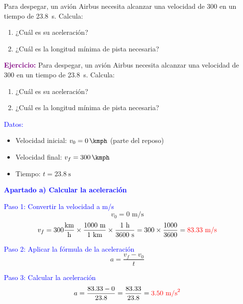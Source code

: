\begin{exercise}
    Para despegar, un avión Airbus necesita alcanzar una velocidad de \qty{300}{\kmph} en un tiempo de \qty{23.8}{\s}. Calcula:
    \begin{enumerate}[label=\letraminuscula]
    \item ¿Cuál es su aceleración?
    \item ¿Cuál es la longitud mínima de pista necesaria?
    \end{enumerate}
    \begin{solu}
        \textbf{\textcolor{purple}{Ejercicio:}} Para despegar, un avión Airbus necesita alcanzar una velocidad de \qty{300}{\kmph} en un tiempo de \qty{23.8}{\s}. Calcula:
        \begin{enumerate}[label=\letraminuscula]
            \item ¿Cuál es su aceleración?
            \item ¿Cuál es la longitud mínima de pista necesaria?
        \end{enumerate}

        \vspace{0.3cm}

        \textcolor{blue}{Datos:}
        \begin{itemize}
            \item Velocidad inicial: $v_0 = \qty{0}{\kmph}$ (parte del reposo)
            \item Velocidad final: $v_f = \qty{300}{\kmph}$
            \item Tiempo: $t = \qty{23.8}{\s}$
        \end{itemize}

        \textbf{\textcolor{blue}{Apartado a) Calcular la aceleración}}

        \textcolor{blue}{Paso 1: Convertir la velocidad a m/s}
        \[
            v_0 = 0 \text{ m/s}
        \]
        \[
            v_f = 300 \frac{\text{km}}{\text{h}} \times \frac{1000 \text{ m}}{1 \text{ km}} \times \frac{1 \text{ h}}{3600 \text{ s}} = 300 \times \frac{1000}{3600} = \textcolor{red}{83.33 \text{ m/s}}
        \]

        \textcolor{blue}{Paso 2: Aplicar la fórmula de la aceleración}
        \[
            \boxed{a = \frac{v_f - v_0}{t}}
        \]

        \textcolor{blue}{Paso 3: Calcular la aceleración}
        \[
            a = \frac{83.33 - 0}{23.8} = \frac{83.33}{23.8} = \textcolor{red}{3.50 \text{ m/s}^2}
        \]


\end{solu}
\end{exercise}
